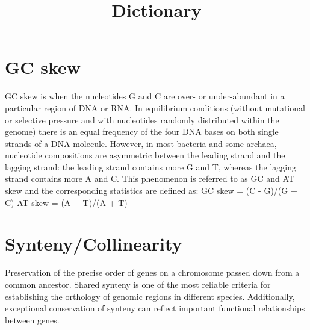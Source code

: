 \documentclass[11pt]{article}
\title{Dictionary}
\author{}
\date{}
\begin{document}
\begin{sloppypar}
  \maketitle

  \linenumbers

\section{GC skew}
GC skew is when the nucleotides G and C are over- or under-abundant in a particular region of DNA or RNA.
In equilibrium conditions (without mutational or selective pressure and with nucleotides randomly distributed within the genome) there is an equal frequency of the four DNA bases on both single strands of a DNA molecule. 
However, in most bacteria and some archaea, nucleotide compositions are asymmetric between the leading strand and the lagging strand: 
the leading strand contains more G and T, whereas the lagging strand contains more A and C. 
This phenomenon is referred to as GC and AT skew and the corresponding statistics are defined as:
\newline
GC skew = (C - G)/(G + C)
\newline
AT skew = (A − T)/(A + T) 

\section{Synteny/Collinearity}
Preservation of the precise order of genes on a chromosome passed down from a common ancestor. 
Shared synteny is one of the most reliable criteria for establishing the orthology of genomic regions in different species. 
Additionally, exceptional conservation of synteny can reflect important functional relationships between genes.   

\end{sloppypar}
\end{document}
